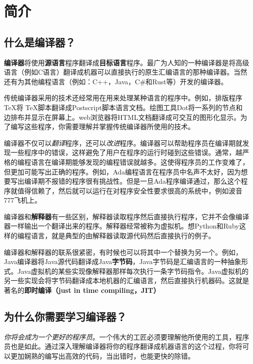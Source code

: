 \documentclass[cn,11pt,chinese]{elegantbook}
\begin{document}
\frontmatter

\tableofcontents

\mainmatter

\chapter{简介}

\section{什么是编译器？}

\textbf{编译器}将使用\textbf{源语言}程序翻译成\textbf{目标语言}程序。最广为人知的一种编译器是将高级语言（例如C语言）翻译成机器可以直接执行的原生汇编语言的那种编译器。当然还有为其他编程语言（例如：C++，Java，C\#和Rust等）开发的编译器。

传统编译器采用的技术还经常用在用来处理某种语言的程序中。例如，排版程序 \TeX 将 \TeX 脚本翻译成Postscript脚本语言文档。绘图工具Dot将一系列的节点和边排布并显示在屏幕上。web浏览器将HTML文档翻译成可交互的图形化显示。为了编写这些程序，你需要理解并掌握传统编译器所使用的技术。

编译器不仅可以\textit{翻译}程序，还可以\textit{改进}程序。编译器可以帮助程序员在编译期就发现一些程序中的错误，这样避免了用户在程序的运行时碰到这些错误。通常，越严格的编程语言在编译期能够发现的编程错误就越多。这使得程序员的工作变难了，但更加可能写出正确的程序。例如，Ada编程语言在程序员中名声不太好，因为想要写出编译期不报错的程序很有挑战性。但是一旦Ada程序编译通过，那么这个程序就值得信赖了，然后就可以运行在对程序安全性要求很高的系统中，例如波音777飞机上。

编译器和\textbf{解释器}有一些区别，解释器读取程序然后直接执行程序，它并不会像编译器一样输出一个翻译出来的程序。解释器经常被称为虚拟机。想Python和Ruby这样的编程语言，就是典型的由解释器读取源代码然后直接执行的例子。

编译器和解释器的联系很紧密，有时候也可以将其中一个替换为另一个。例如，Java编译器将Java源代码翻译成Java\textbf{字节码}，Java字节码是汇编语言的一种抽象形式。Java虚拟机的某些实现像解释器那样每次执行一条字节码指令。Java虚拟机的另一些实现会将字节码翻译成本地机器的汇编语言，然后直接执行机器码。这就是著名的\textbf{即时编译（just in time compiling，JIT）}

\section{为什么你需要学习编译器？}

\textit{你将会成为一个更好的程序员}。一个伟大的工匠必须要理解他所使用的工具，程序员也是如此。通过深入理解编译器将你的程序翻译成机器语言的这个过程，你将可以更加娴熟的编写出高效的代码，当出错时，也能更快的除错。
\end{document}
